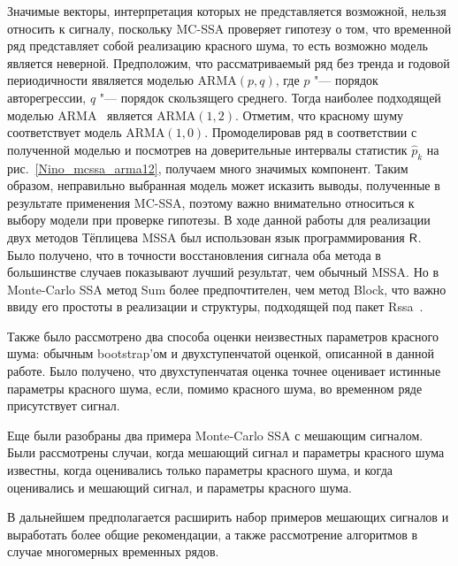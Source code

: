 \documentclass[specialist,
substylefile = spbu_report.rtx,
subf,href,colorlinks=true, 12pt]{disser}
\theoremstyle{definition}
\begin{document}
Значимые векторы, интерпретация которых не представляется возможной, нельзя относить к сигналу, поскольку MC-SSA проверяет гипотезу о том, что временной ряд представляет собой реализацию красного шума, то есть возможно модель является неверной. Предположим, что рассматриваемый ряд без тренда и годовой периодичности явяляется моделью ARMA$(p, q)$, где $p$ "--- порядок авторегрессии, $q$ "--- порядок скользящего среднего. Тогда наиболее подходящей моделью ARMA~\cite{auto.arima} является ARMA$(1, 2)$. Отметим, что красному шуму соответствует модель ARMA$(1, 0)$. Промоделировав ряд в соответствии с полученной моделью и посмотрев на доверительные интервалы статистик $\hat p_k$ на рис.~\ref{Nino_mcssa_arma12}, получаем много значимых компонент. Таким образом, неправильно выбранная модель может исказить выводы, полученные в результате применения MC-SSA, поэтому важно внимательно относиться к выбору модели при проверке гипотезы.
\conclusion
В ходе данной работы для реализации двух методов Тёплицева MSSA был использован язык программирования $\mathsf{R}$. Было получено, что в точности восстановления сигнала оба метода в большинстве случаев показывают лучший результат, чем обычный MSSA. Но в Monte-Carlo SSA метод Sum более предпочтителен, чем метод Block, что важно ввиду его простоты в реализации и структуры, подходящей под пакет Rssa~\cite{Rssa}.

Также было рассмотрено два способа оценки неизвестных параметров красного шума: обычным bootstrap'ом и двухступенчатой оценкой, описанной в данной работе. Было получено, что двухступенчатая оценка точнее оценивает истинные параметры красного шума, если, помимо красного шума, во временном ряде присутствует сигнал.

Еще были разобраны два примера Monte-Carlo SSA с мешающим сигналом. Были рассмотрены случаи, когда мешающий сигнал и параметры красного шума известны, когда оценивались только параметры красного шума, и когда оценивались и мешающий сигнал, и параметры красного шума.

В дальнейшем предполагается расширить набор примеров мешающих сигналов и выработать более общие рекомендации, а также рассмотрение алгоритмов в случае многомерных временных рядов.


\end{document}
